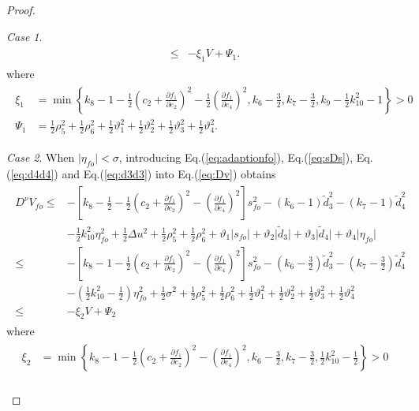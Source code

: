 \documentclass[ShortAfour]{sage}
\theoremstyle{plain}
\theoremstyle{remark}
\newtheorem{mycase1}{Case}
\begin{document}
\begin{proof}
\begin{mycase1}
\begin{align}
\begin{split}
      \le& -\xi_1V+\Psi_1.
    \end{split}\end{align}
    where
    \begin{align}\begin{split}
      \xi_1 &= \min\left\{k_8-1-\frac{1}{2}\left(c_2+\frac{\partial f_1}{\partial e_2}\right)^2-\frac{1}{2}\left(\frac{\partial f_1}{\partial e_4}\right)^2,k_6-\frac{3}{2},k_7-\frac{3}{2},k_9-\frac{1}{2}k_{10}^2-1\right\}>0\\
      \Psi_1&=\frac{1}{2}\rho_5^2 +\frac{1}{2}\rho_6^2+\frac{1}{2}\vartheta_1^2+\frac{1}{2}\vartheta_2^2+\frac{1}{2}\vartheta_3^2+\frac{1}{2}\vartheta_4^2.
    \end{split}\end{align}
  \end{mycase1}
  \begin{mycase1}
    When $\vert\eta_{fo}\vert<\sigma$, introducing Eq.(\ref{eq:adaptionfo}), Eq.(\ref{eq:sDs}), Eq.(\ref{eq:d4d4}) and Eq.(\ref{eq:d3d3}) into Eq.(\ref{eq:Dv}) obtains
    \begin{align}\begin{split}
      D^\nu V_{fo} \le&-\left[k_8-\frac{1}{2}-\frac{1}{2}\left(c_2+\frac{\partial f_1}{\partial e_2}\right)^2-\left(\frac{\partial f_1}{\partial e_4}\right)^2\right]s_{fo}^2-\left(k_6-1\right)\tilde{d}_3^2-\left(k_7-1\right)\tilde{d}_4^2\\
      &-\frac{1}{2}k_{10}^2\eta_{fo}^2+\frac{1}{2}\Delta u^2+\frac{1}{2}\rho_5^2+\frac{1}{2}\rho_6^2+\vartheta_1\vert s_{fo}\vert+\vartheta_2\vert \tilde d_3\vert+\vartheta_3\vert \tilde d_4\vert+\vartheta_4\vert \eta_{fo}\vert\\
      \le&-\left[k_8-1-\frac{1}{2}\left(c_2+\frac{\partial f_1}{\partial e_2}\right)^2-\left(\frac{\partial f_1}{\partial e_4}\right)^2\right]s_{fo}^2-\left(k_6-\frac{3}{2}\right)\tilde{d}_3^2-\left(k_7-\frac{3}{2}\right)\tilde{d}_4^2\\
      &-(\frac{1}{2}k_{10}^2-\frac{1}{2})\eta_{fo}^2+\frac{1}{2}\sigma^2+\frac{1}{2}\rho_5^2+\frac{1}{2}\rho_6^2+\frac{1}{2}\vartheta_1^2+\frac{1}{2}\vartheta_2^2+\frac{1}{2}\vartheta_3^2+\frac{1}{2}\vartheta_4^2\\
      \le& -\xi_2V+\Psi_2
    \end{split}\end{align}
    where
    \begin{align}\begin{split}
      \xi_2&=\min\left\{k_8-1-\frac{1}{2}\left(c_2+\frac{\partial f_1}{\partial e_2}\right)^2-\left(\frac{\partial f_1}{\partial e_4}\right)^2,k_6-\frac{3}{2},k_7-\frac{3}{2},\frac{1}{2}k_{10}^2-\frac{1}{2}\right\}>0\\

\end{split}
\end{align}
\end{mycase1}
\end{proof}
\end{document}
